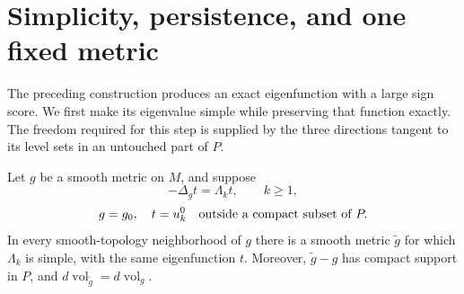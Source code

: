 \section{Simplicity, persistence, and one fixed metric}
\label{sec:spectral}

The preceding construction produces an exact eigenfunction with a large
sign score.  We first make its eigenvalue simple while preserving that
function exactly.  The freedom required for this step is supplied by the
three directions tangent to its level sets in an untouched part of $P$.

\begin{lemma}
\label{spec:simple}
Let $g$ be a smooth metric on $M$, and suppose
\[
 -\Delta_g t=\Lambda_k t,\qquad k\ge1,
\]
\[
 g=g_0,\quad t=u_k^0
 \quad\hbox{outside a compact subset of }P.
\]
In every smooth-topology neighborhood of $g$ there is a smooth metric
$\widetilde g$ for which $\Lambda_k$ is simple, with the same
eigenfunction $t$.  Moreover, $\widetilde g-g$ has compact support in
$P$, and $d\operatorname{vol}_{\widetilde g}=d\operatorname{vol}_g$.
\end{lemma}

